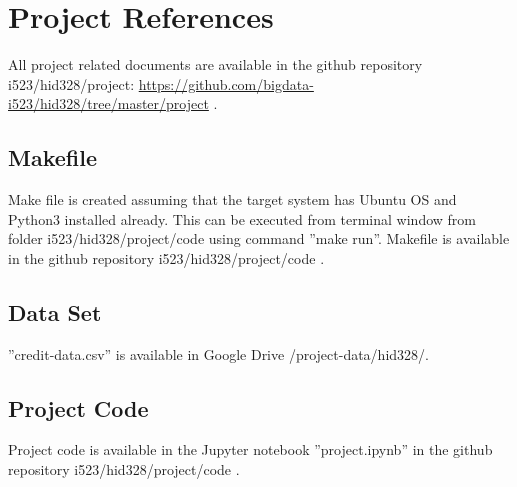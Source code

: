 \documentclass[sigconf]{acmart}
\begin{document}
\section{Project References}

All project related documents are available in the github repository i523/hid328/project:  \url{https://github.com/bigdata-i523/hid328/tree/master/project} \cite{github}.

\subsection{Makefile}\label{Makefile}

Make file is created assuming that the target system has Ubuntu OS and Python3 installed already. This can be executed from terminal window from folder i523/hid328/project/code using command ''make run''. Makefile is available in the github repository i523/hid328/project/code \cite{code}.

\subsection{Data Set}

''credit-data.csv'' is available in Google Drive /project-data/hid328/.

\subsection{Project Code}\label{Project Code}

Project code is available in the Jupyter notebook ''project.ipynb'' in the github repository i523/hid328/project/code \cite{code}.
\end{document}
